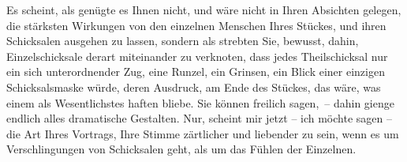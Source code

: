 \pstart
           Es scheint, als genügte es Ihnen nicht, und wäre nicht in Ihren Absichten gelegen,
               die stärksten Wirkungen von den einzelnen Menschen Ihres Stückes, und ihren Schicksalen ausgehen zu
               lassen, sondern als strebten Sie, bewusst, dahin, Einzelschicksale derart miteinander
               zu verknoten, dass jedes Theilschicksal nur ein sich unterordnender Zug, eine Runzel,
               ein Grinsen, ein Blick einer einzigen Schicksalsmaske würde, deren Ausdruck, am Ende
               des Stückes,
               das wäre, was einem als Wesentlichstes haften bliebe. {\pb}Sie können freilich sagen, – dahin
               gienge endlich alles dramatische Gestalten. Nur, scheint mir jetzt – ich möchte sagen
               – die Art Ihres Vortrags, Ihre Stimme zärtlicher und liebender zu sein, wenn es um
               Verschlingungen von Schicksalen geht, als um das Fühlen der Einzelnen.\pend
           
